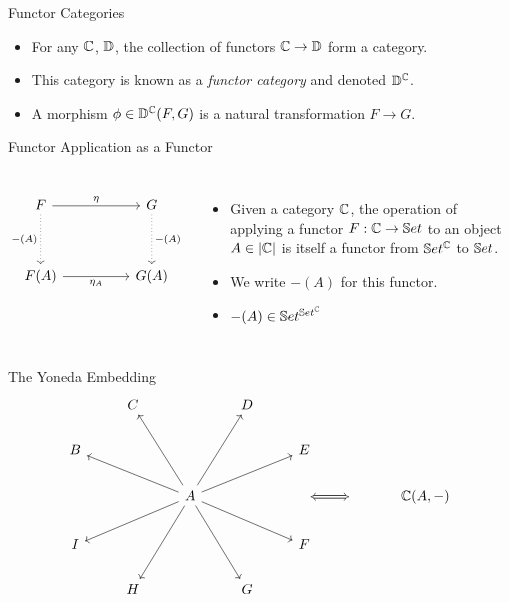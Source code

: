 \begin{frame}{Functor Categories}
	\begin{itemize}
		\item For any $\mathbb{C}$, $\mathbb{D}$, the collection of functors $\mathbb{C} \to \mathbb{D}$ form a category.
		\pause\item This category is known as a \textit{functor category} and denoted $\mathbb{D}^{\mathbb{C}}$.
		\pause\item A morphism $\phi \in \mathbb{D}^{\mathbb{C}}(F, G)$ is a natural transformation $F \to G$.
	\end{itemize}
\end{frame}
\begin{frame}[fragile]{Functor Application as a Functor}
	\begin{columns}
		\[\begin{tikzcd}
			F && G \\
			\\
			{F(A)} && {G(A)}
			\arrow["{\eta}", from=1-1, to=1-3]
			\arrow["{-(A)}"', dotted, from=1-1, to=3-1]
			\arrow["{-(A)}", dotted, from=1-3, to=3-3]
			\arrow["{\eta_A}"', from=3-1, to=3-3]
		\end{tikzcd}\]
		\begin{itemize}
			\item Given a category $\mathbb{C}$, the operation of applying a functor $F : \mathbb{C} \to \mathbb{S}et$ to an object $A \in |\mathbb{C}|$ is itself a functor from $\mathbb{S}et^{\mathbb{C}}$ to $\mathbb{S}et$.
			\pause\item We write $-(A)$ for this functor.
			\pause\item $-(A) \in \mathbb{S}et^{\mathbb{S}et^{\mathbb{C}}}$
		\end{itemize}
	\end{columns}
\end{frame}
\begin{frame}[fragile]{The Yoneda Embedding}
	\[\begin{tikzcd}
		& C && D \\
		B &&&& E \\
		&& A && {} & {} & {\mathbb{C}(A, -)} \\
		I &&&& F \\
		& H && G
		\arrow[from=3-3, to=1-2]
		\arrow[from=3-3, to=1-4]
		\arrow[from=3-3, to=2-1]
		\arrow[from=3-3, to=2-5]
		\arrow[from=3-3, to=4-1]
		\arrow[from=3-3, to=4-5]
		\arrow[from=3-3, to=5-2]
		\arrow[from=3-3, to=5-4]
		\arrow[Leftrightarrow, from=3-5, to=3-6]
	\end{tikzcd}\]
\end{frame}
